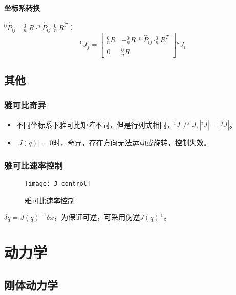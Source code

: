\documentclass[
12pt, %
a4paper, 
oneside, %
headinclude,footinclude, %
]{scrartcl}
\begin{document}
\paragraph{坐标系转换}
$ ^0\hat{P}_{ij} = ^0_n R \cdot ^n\hat{P}_{ij} \cdot ^0_n R^T $：
$$ ^0 J_j = \begin{bmatrix} ^0_n R & -^0_n R \cdot ^n\hat{P}_{ij} \cdot ^0_n R^T \\ 0 & ^0_n R \end{bmatrix} {}^n J_i $$
\subsection[其他]{其他}
\subsubsection[雅可比奇异]{雅可比奇异}
\begin{itemize}
\item 不同坐标系下雅可比矩阵不同，但是行列式相同，$ ^i J \neq ^j J, |^i J| = |^j J| $。
\item $ |J(q)| = 0 $时，奇异，存在方向无法运动或旋转，控制失效。
\end{itemize} 
\subsubsection[雅可比速率控制]{雅可比速率控制}
\begin{figure}[H]
\centering 
\texttt{[image: J\_control]} 
\caption[雅可比速率控制]{雅可比速率控制}
\end{figure}

$ \delta q = J(q)^{-1} \delta x $，为保证可逆，可采用伪逆$ J(q)^+ $。
\section{动力学}
\subsection[刚体动力学]{刚体动力学}
\end{document}

